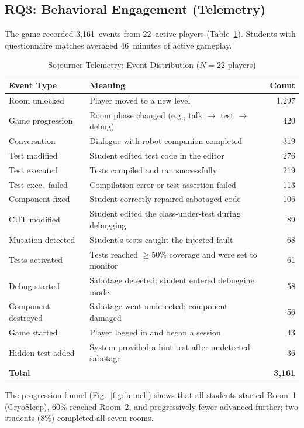 \documentclass[conference]{IEEEtran}
\begin{document}
\subsection{RQ3: Behavioral Engagement (Telemetry)}

The game recorded 3,161~events from 22~active players (Table~\ref{tab:telemetry}).
Students with questionnaire matches averaged 46~minutes of active gameplay.

\begin{table}[htbp]
\caption{Sojourner Telemetry: Event Distribution ($N = 22$ players)}
\label{tab:telemetry}
\centering
\small
\begin{tabular}{p{2cm}p{3.5cm}r}
\toprule
Event Type & Meaning & Count \\
\midrule
Room unlocked & Player moved to a new level & 1,297 \\
Game progression & Room phase changed (e.g., talk $\to$ test $\to$ debug) & 420 \\
Conversation & Dialogue with robot companion completed & 319 \\
Test modified & Student edited test code in the editor & 276 \\
Test executed & Tests compiled and ran successfully & 219 \\
Test exec.\ failed & Compilation error or test assertion failed & 113 \\
Component fixed & Student correctly repaired sabotaged code & 106 \\
CUT modified & Student edited the class-under-test during debugging & 89 \\
Mutation detected & Student's tests caught the injected fault & 68 \\
Tests activated & Tests reached $\geq$50\% coverage and were set to monitor & 61 \\
Debug started & Sabotage detected; student entered debugging mode & 58 \\
Component destroyed & Sabotage went undetected; component damaged & 56 \\
Game started & Player logged in and began a session & 43 \\
Hidden test added & System provided a hint test after undetected sabotage & 36 \\
\midrule
\textbf{Total} & & \textbf{3,161} \\
\bottomrule
\end{tabular}
\end{table}

The progression funnel (Fig.~\ref{fig:funnel}) shows that all students started Room~1 (CryoSleep), 60\% reached Room~2, and progressively fewer advanced further; two students (8\%) completed all seven rooms.
\end{document}
